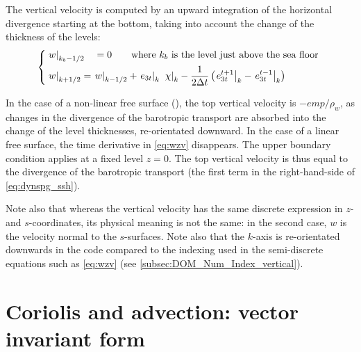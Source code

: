 \documentclass[../main/NEMO_manual]{subfiles}
\begin{document}
The vertical velocity is computed by an upward integration of the horizontal divergence starting at the bottom,
taking into account the change of the thickness of the levels:
\begin{equation}
  \label{eq:wzv}
  \left\{
    \begin{aligned}
      &\left. w \right|_{k_b-1/2} \quad= 0    \qquad \text{where } k_b \text{ is the level just above the sea floor }  	\\
      &\left. w \right|_{k+1/2}     = \left. w \right|_{k-1/2}  +  \left. e_{3t} \right|_{k}\;  \left. \chi \right|_k
      - \frac{1} {2 \Delta t} \left(  \left. e_{3t}^{t+1}\right|_{k} - \left. e_{3t}^{t-1}\right|_{k}\right)
    \end{aligned}
  \right.
\end{equation}

In the case of a non-linear free surface (), the top vertical velocity is $-\textit{emp}/\rho_w$, 
as changes in the divergence of the barotropic transport are absorbed into the change of the level thicknesses,
re-orientated downward.
In the case of a linear free surface, the time derivative in \autoref{eq:wzv} disappears.
The upper boundary condition applies at a fixed level $z=0$.
The top vertical velocity is thus equal to the divergence of the barotropic transport
(\ie the first term in the right-hand-side of \autoref{eq:dynspg_ssh}).

Note also that whereas the vertical velocity has the same discrete expression in $z$- and $s$-coordinates,
its physical meaning is not the same:
in the second case, $w$ is the velocity normal to the $s$-surfaces.
Note also that the $k$-axis is re-orientated downwards in the \fortran code compared to
the indexing used in the semi-discrete equations such as \autoref{eq:wzv}
(see \autoref{subsec:DOM_Num_Index_vertical}). 


\section{Coriolis and advection: vector invariant form}
\label{sec:DYN_adv_cor_vect}

\end{document}
